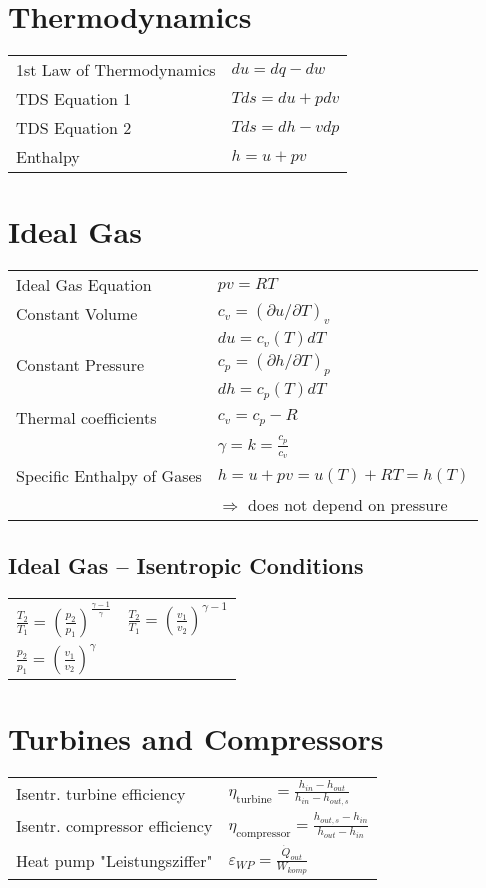 




\section*{Thermodynamics}
\begin{tabular}{ m{5cm} l}
    1st Law of Thermodynamics & $du = dq - dw$  \\
    TDS Equation 1 & $Tds = du + pdv$ \\
    TDS Equation 2 & $Tds = dh - vdp$ \\
    Enthalpy & $h = u + pv$
\end{tabular}

\section*{Ideal Gas}
\begin{tabular}{ m{5cm} l}
    Ideal Gas Equation & $pv = RT$ \\
    Constant Volume & $c_v = (\partial u / \partial T)_v$ \\
     & $du = c_v (T) dT$ \\
     Constant Pressure & $c_p = (\partial h / \partial T)_p$ \\
     & $dh = c_p (T) dT$ \\
     Thermal coefficients & $c_v = c_p - R$ \\
      & $\gamma = k = \frac{c_p}{c_v}$ \\
      Specific Enthalpy of Gases & $h = u + pv = u(T) + RT = h(T)$ \\
       & $\Rightarrow$ does not depend on pressure
\end{tabular}

\subsection*{Ideal Gas – Isentropic Conditions}
\begin{tabular}{ m{5cm} l}
    $\frac{T_2}{T_1} = \left( \frac{p_2}{p_1} \right)^{ \frac{\gamma - 1}{\gamma}} $ & $\frac{T_2}{T_1} = \left( \frac{v_1}{v_2} \right)^{ \gamma -1 } $ \\
    $\frac{p_2}{p_1} = \left( \frac{v_1}{v_2} \right)^{ \gamma } $ & \\
\end{tabular}

\section*{Turbines and Compressors}
    \begin{tabular}{ m{5cm} l}
    Isentr. turbine efficiency & $\eta_{\text{turbine}} = \frac{h_{in} - h_{out}}{h_{in} - h_{out,s}}$ \\
    Isentr. compressor efficiency & $\eta_{\text{compressor}} = \frac{h_{out,s} - h_{in}}{h_{out} - h_{in}}$ \\
    Heat pump "Leistungsziffer" & $\varepsilon_{WP} = \frac{\Dot{Q}_{out}}{W_{komp}}$ \\
    \end{tabular}
    
